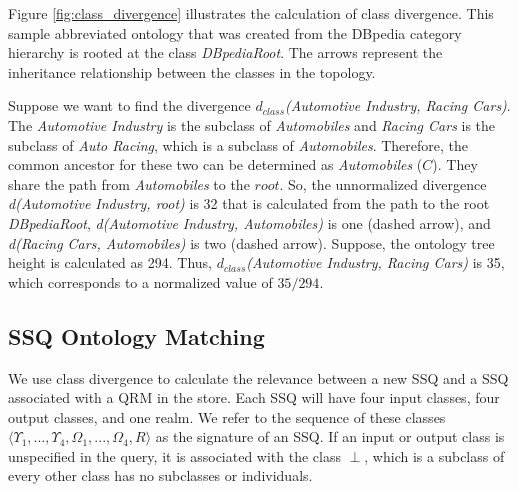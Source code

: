 Figure \ref{fig:class_divergence} illustrates the calculation of class
divergence. This sample abbreviated ontology that was created from the
DBpedia category hierarchy is rooted at the class
\textit{DBpediaRoot}. The arrows represent the inheritance
relationship between the classes in the topology.

Suppose we want to find the divergence $d_{class}$\textit{(Automotive
  Industry, Racing Cars)}. The \textit{Automotive Industry} is the
subclass of \textit{Automobiles} and \textit{Racing Cars} is the
subclass of \textit{Auto Racing}, which is a subclass of \textit{Automobiles}. Therefore, the common ancestor for
these two can be determined as \textit{Automobiles} ($C$). They share
the path from \textit{Automobiles} to the $root$. So, the unnormalized
divergence \textit{d(Automotive Industry, root)} is 32 that is calculated from the path to the root \textit{DBpediaRoot}, \textit{d(Automotive Industry, Automobiles)} is one
(dashed arrow), and \textit{d(Racing Cars, Automobiles)} is two
(dashed arrow). Suppose, the ontology tree height is calculated as
294. Thus, $d_{class}$\textit{(Automotive Industry, Racing Cars)} is 35, which corresponds to a normalized value of $35/294$.

\subsection{SSQ Ontology Matching}
\label{sec:oqom}

We use class divergence to calculate the relevance between a new SSQ
and a SSQ associated with a QRM in the store.  Each SSQ will have four
input classes, four output classes, and one realm.  We refer to the
sequence of these classes $\langle \Upsilon_1, ..., \Upsilon_4,
\Omega_1, ..., \Omega_4, R \rangle$ as the signature of an SSQ. If an
input or output class is unspecified in the query, it is associated
with the class $\perp$, which is a subclass of every other class has
no subclasses or individuals.


